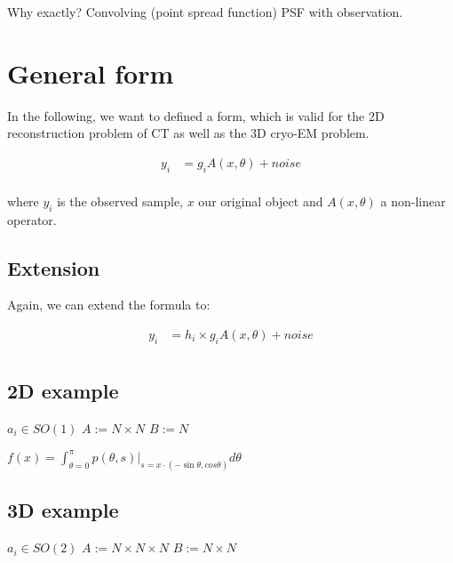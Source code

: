 Why exactly?
Convolving (point spread function) PSF  with observation.


\section{General form}

In the following, we want to defined a form, which is valid for the 2D reconstruction 
problem of CT as well as the 3D cryo-EM problem.


\begin{equation}
    \begin{aligned}
        y_i &= g_i  A(x, \theta) + noise \\
    \end{aligned}
\end{equation}

where $y_i$ is the observed sample, $x$ our original object and $A(x, \theta)$ a non-linear operator.



\subsection{Extension}
Again, we can extend the formula to:

\begin{equation}
    \begin{aligned}
        y_i &= h_i \times g_i  A(x, \theta) + noise \\
    \end{aligned}
\end{equation}

\subsection{2D example}

$a_i \in SO(1)$
$A := N \times N$
$B := N$

$f(x) = \int_{\theta = 0}^{\pi} p(\theta, s) |_{s=x \cdot (- \sin \theta, cos \theta) } d \theta$



\subsection{3D example}

$a_i \in SO(2)$
$A := N \times N \times N$
$B := N \times N$





